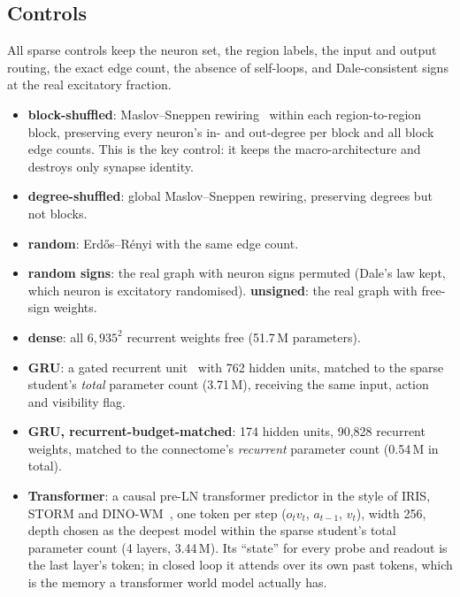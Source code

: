 \subsection{Controls}
\label{sec:controls}
All sparse controls keep the neuron set, the region labels, the input and output routing, the exact edge count, the
absence of self-loops, and Dale-consistent signs at the real excitatory fraction.
\begin{itemize}
  \item \textbf{block-shuffled}: Maslov--Sneppen rewiring~\cite{maslov2002specificity} within each region-to-region
        block, preserving every neuron's in- and out-degree per block and all block edge counts. This is the key
        control: it keeps the macro-architecture and destroys only synapse identity.
  \item \textbf{degree-shuffled}: global Maslov--Sneppen rewiring, preserving degrees but not blocks.
  \item \textbf{random}: Erd\H{o}s--R\'enyi with the same edge count.
  \item \textbf{random signs}: the real graph with neuron signs permuted (Dale's law kept, which neuron is
        excitatory randomised). \textbf{unsigned}: the real graph with free-sign weights.
  \item \textbf{dense}: all $6{,}935^2$ recurrent weights free (51.7\,M parameters).
  \item \textbf{GRU}: a gated recurrent unit~\cite{cho2014learning} with 762 hidden units, matched to the sparse student's
        \emph{total} parameter count (3.71\,M), receiving the same input, action and visibility flag.
  \item \textbf{GRU, recurrent-budget-matched}: 174 hidden units, 90,828 recurrent weights, matched to the connectome's
        \emph{recurrent} parameter count (0.54\,M in total).
  \item \textbf{Transformer}: a causal pre-LN transformer predictor in the style of IRIS, STORM and
        DINO-WM~\cite{micheli2023iris,zhang2023storm,zhou2024dinowm}, one token per step ($o_t v_t$, $a_{t-1}$, $v_t$),
        width 256, depth chosen as the deepest model within the sparse student's total parameter count (4 layers, 3.44\,M).
        Its ``state'' for every probe and readout is the last layer's token; in closed loop it attends over its own past
        tokens, which is the memory a transformer world model actually has.
\end{itemize}

